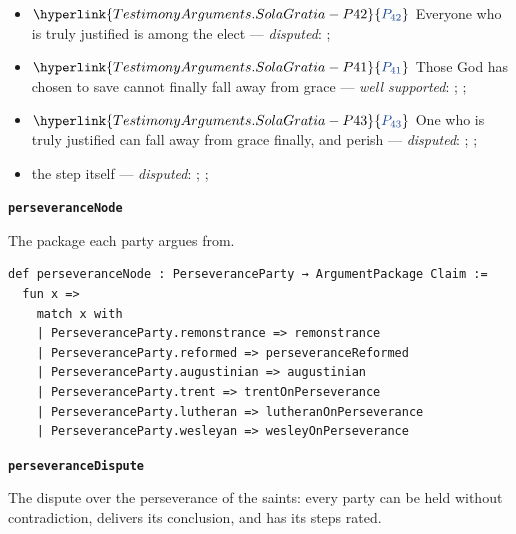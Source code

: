 \documentclass[11pt]{article}
\newcommand{\pvar}[2]{\hyperlink{#1-P#2}{\textcolor{claimlink}{P_{#2}}}}
\begin{document}
\begin{itemize}
\begin{itemize}
\item \(\pvar{TestimonyArguments.SolaGratia}{42}\) Everyone who is truly justified is among the elect --- \emph{disputed}: \cite[X.4]{westminster-confession-1647}; \cite[137--138]{calvin-hebrews-1853}
\item \(\pvar{TestimonyArguments.SolaGratia}{41}\) Those God has chosen to save cannot finally fall away from grace --- \emph{well supported}: \cite[XVII.1]{westminster-confession-1647}; \cite[636]{schaff-creeds-christendom-3-1977}; \cite[593]{schaff-creeds-christendom-3-1977}
\item \(\pvar{TestimonyArguments.SolaGratia}{43}\) One who is truly justified can fall away from grace finally, and perish --- \emph{disputed}: \cite[Trent, Session VI (1547), canon 23]{tanner-decrees-1990}; \cite[47]{waterworth-trent-1848}; \cite[439]{wesley-works-9-1827}
\item the step itself --- \emph{disputed}: \cite[444--445]{wesley-works-9-1827}; \cite[415--416]{calvin-commentary-john-1847}; \cite[Solid Declaration XI.45]{concordia-triglotta-1921}
\end{itemize}
\end{itemize}
\par\medskip\noindent\textbf{\texttt{perseverance\allowbreak{}Node}}\par\nobreak\noindent
The package each party argues from.

{\small\begin{verbatim}
def perseveranceNode : PerseveranceParty → ArgumentPackage Claim :=
  fun x =>
    match x with
    | PerseveranceParty.remonstrance => remonstrance
    | PerseveranceParty.reformed => perseveranceReformed
    | PerseveranceParty.augustinian => augustinian
    | PerseveranceParty.trent => trentOnPerseverance
    | PerseveranceParty.lutheran => lutheranOnPerseverance
    | PerseveranceParty.wesleyan => wesleyOnPerseverance
\end{verbatim}}
\par\medskip\noindent\textbf{\texttt{perseverance\allowbreak{}Dispute}}\par\nobreak\noindent
The dispute over the perseverance of the saints: every party can be held without contradiction, delivers its conclusion, and has its steps rated.
\end{document}
